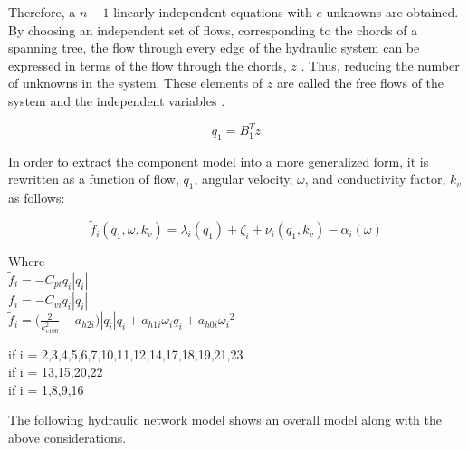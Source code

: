 Therefore, a $n-1$ linearly independent equations with $e$ unknowns are obtained. By choosing an independent set of flows, corresponding to the chords of a spanning tree, the 
flow through every edge of the hydraulic system can be expressed in terms of the flow through the chords, $z$ \cite{GraphModel}. Thus, reducing the
number of unknowns in the system. These elements of $z$ are called the free 
flows of the system and the independent variables \cite{GraphTheoryCarsten}.

\begin{equation}
  q_1 = B_1 ^{T}  z
  \label{ChordRelation}
\end{equation}



In order to extract the component model into a more generalized form, it is rewritten as a function of flow, $q_1$, angular velocity, $\omega$, and conductivity factor, $k_v$ as follows:

\begin{equation}
  \tilde{f}_i(q_1, \omega, k_v) = \lambda_i(q_1) + \zeta_i + \nu_i(q_1, k_v) - \alpha_i(\omega)
  \label{ComponentFunction}
\end{equation}

\begin{minipage}[t]{0.20\textwidth}
Where\\
\hspace*{2mm} $\tilde{f}_i = -C_{pi} q_i |q_i|$  \\
\hspace*{2mm} $\tilde{f}_i = -C_{vi} q_i |q_i|$  \\
\hspace*{2mm} $\tilde{f}_i = \Big(\frac{2}{k_{v100}^2} - a_{h2i}\Big)|q_i| q_i  + a_{h1i} \omega_{i} q_i + a_{h0i}{\omega_i}^2$  
\end{minipage}
\begin{minipage}[t]{0.68\textwidth}
\vspace*{2mm}
\hspace*{25mm} if i = 2,3,4,5,6,7,10,11,12,14,17,18,19,21,23\\
\hspace*{25mm} if i = 13,15,20,22						   \\
\hspace*{65mm} if i = 1,8,9,16						   
\end{minipage}



The following hydraulic network model shows an overall model along with the above considerations. 


